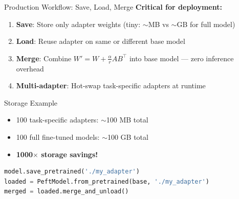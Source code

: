 \documentclass[aspectratio=169,10pt]{beamer}
\begin{document}
\begin{frame}[fragile]{Production Workflow: Save, Load, Merge}
	\textbf{Critical for deployment:}

	\vspace{0.3cm}
	\begin{enumerate}
		\item \textbf{Save}: Store only adapter weights (tiny: $\sim$MB vs $\sim$GB for full model)
		\item \textbf{Load}: Reuse adapter on same or different base model
		\item \textbf{Merge}: Combine $W' = W + \frac{\alpha}{r} AB^\top$ into base model --- zero inference overhead
		\item \textbf{Multi-adapter}: Hot-swap task-specific adapters at runtime
	\end{enumerate}

	\vspace{0.3cm}
	\begin{block}{Storage Example}
		\begin{itemize}
			\item 100 task-specific adapters: $\sim$100 MB total
			\item 100 full fine-tuned models: $\sim$100 GB total
			\item \textbf{1000$\times$ storage savings!}
		\end{itemize}
	\end{block}

	\vspace{0.2cm}
	\begin{lstlisting}[language=Python]
model.save_pretrained('./my_adapter')
loaded = PeftModel.from_pretrained(base, './my_adapter')
merged = loaded.merge_and_unload()
    \end{lstlisting}
\end{frame}
\end{document}
